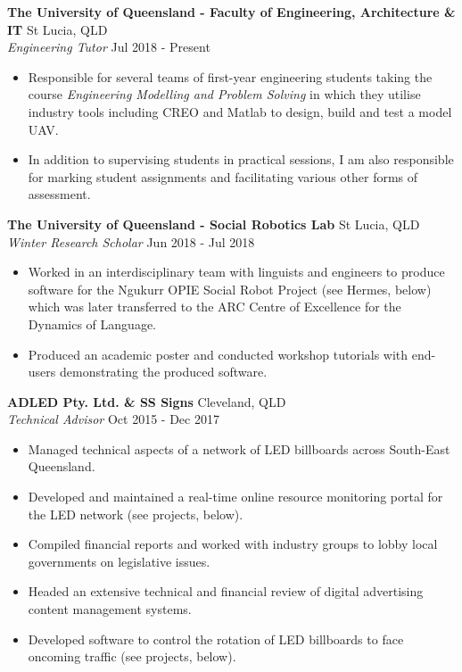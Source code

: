\documentclass[a4paper]{article}
\newenvironment{myitemize}
{   \small
    \vspace{-2pt}
    \begin{itemize}
    \setlength{\itemsep}{0pt}
    \setlength{\parskip}{0pt}
    \setlength{\parsep}{0pt}     }
{ \end{itemize}                  }
\begin{document}
\textbf{The University of Queensland - Faculty of Engineering, Architecture \& IT} \hfill St Lucia, QLD\\
\textit{Engineering Tutor} \hfill Jul 2018 - Present\\
\begin{myitemize} \itemsep 0.75mm
	\item Responsible for several teams of first-year engineering students taking the course \textit{Engineering Modelling and Problem Solving} in which they utilise industry tools including CREO and Matlab to design, build and test a model UAV.
	\item In addition to supervising students in practical sessions, I am also responsible for marking student assignments and facilitating various other forms of assessment.
\end{myitemize}
\vspace{-1mm}
\textbf{The University of Queensland - Social Robotics Lab} \hfill St Lucia, QLD\\
\textit{Winter Research Scholar} \hfill Jun 2018 - Jul 2018\\
\begin{myitemize} \itemsep 0.75mm
	\item Worked in an interdisciplinary team with linguists and engineers to produce software for the Ngukurr OPIE Social Robot Project (see Hermes, below) which was later transferred to the ARC Centre of Excellence for the Dynamics of Language.
	\item Produced an academic poster and conducted workshop tutorials with end-users demonstrating the produced software.
\end{myitemize}
\vspace{-1mm}
\textbf{ADLED Pty. Ltd. \& SS Signs} \hfill Cleveland, QLD\\
\textit{Technical Advisor} \hfill Oct 2015 - Dec 2017\\
\begin{myitemize} \itemsep 0.75mm
	\item Managed technical aspects of a network of LED billboards across South-East Queensland.
	\item Developed and maintained a real-time online resource monitoring portal for the LED network (see projects, below).
	\item Compiled financial reports and worked with industry groups to lobby local governments on legislative issues.
	\item Headed an extensive technical and financial review of digital advertising content management systems.
	\item Developed software to control the rotation of LED billboards to face oncoming traffic (see projects, below).
\end{myitemize}
\end{document}
